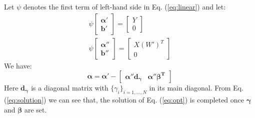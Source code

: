Let $\psi$ denotes the first term of left-hand side in Eq. (\ref{eq:linear}) and let:
\begin{equation}
\begin{array}{c}
 {\psi}\left[ {\begin{array}{*{20}{c}}
{\boldsymbol{\alpha} '}\\
{\boldsymbol{b}'}
\end{array}} \right] = \left[ {\begin{array}{*{20}{c}}
Y\\
0
\end{array}} \right]\\
{\psi}\left[ {\begin{array}{*{20}{c}}
{\boldsymbol{\alpha} ''}\\
{\boldsymbol{b}''}
\end{array}} \right] = \left[ {\begin{array}{*{20}{c}}
{X{{\left( {W'} \right)}^T}}\\
0
\end{array}} \right]
\end{array}
\end{equation}
We have:
\begin{equation}\label{eq:solution}
 \boldsymbol{\alpha}  = \boldsymbol{\alpha} ' - \left[ {\begin{array}{*{20}{c}}
 {\boldsymbol{\alpha} ''\boldsymbol{d_{\gamma}}}&{{\boldsymbol{\alpha} ''\boldsymbol{\beta ^T}}}
 \end{array}} \right]
\end{equation}
Here $\boldsymbol{d_{\gamma}}$ is a diagonal matrix with $\{\gamma_i\}_{i=1,...,N}$ in its main diagonal. From Eq. (\ref{eq:solution}) we can see that, the solution of Eq. (\ref{eq:opt}) is completed once $\boldsymbol{\gamma}$ and $\boldsymbol{\beta}$ are set.

